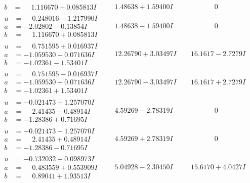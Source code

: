 \documentclass[1p]{elsarticle_modified}
\theoremstyle{definition}
\begin{document}
$$\begin{array}{c|c|c}
\begin{aligned}
b &= \phantom{-}1.116670 - 0.085813 I\end{aligned}
 & \phantom{-}1.48638 + 1.59400 I & \phantom{-0.000000 } 0 \\ \hline\begin{aligned}
u &= \phantom{-}0.248016 - 1.217990 I \\
a &= -2.02802 - 0.13854 I \\
b &= \phantom{-}1.116670 + 0.085813 I\end{aligned}
 & \phantom{-}1.48638 - 1.59400 I & \phantom{-0.000000 } 0 \\ \hline\begin{aligned}
u &= \phantom{-}0.751595 + 0.016937 I \\
a &= -1.059530 - 0.071636 I \\
b &= -1.02361 - 1.53401 I\end{aligned}
 & \phantom{-}12.26790 + 3.03497 I & \phantom{-}16.1617 - 2.7279 I \\ \hline\begin{aligned}
u &= \phantom{-}0.751595 - 0.016937 I \\
a &= -1.059530 + 0.071636 I \\
b &= -1.02361 + 1.53401 I\end{aligned}
 & \phantom{-}12.26790 - 3.03497 I & \phantom{-}16.1617 + 2.7279 I \\ \hline\begin{aligned}
u &= -0.021473 + 1.257070 I \\
a &= \phantom{-}2.41435 - 0.48914 I \\
b &= -1.28386 + 0.71695 I\end{aligned}
 & \phantom{-}4.59269 - 2.78319 I & \phantom{-0.000000 } 0 \\ \hline\begin{aligned}
u &= -0.021473 - 1.257070 I \\
a &= \phantom{-}2.41435 + 0.48914 I \\
b &= -1.28386 - 0.71695 I\end{aligned}
 & \phantom{-}4.59269 + 2.78319 I & \phantom{-0.000000 } 0 \\ \hline\begin{aligned}
u &= -0.732032 + 0.098973 I \\
a &= \phantom{-}0.483559 + 0.553909 I \\
b &= \phantom{-}0.89041 + 1.93513 I\end{aligned}
 & \phantom{-}5.04928 - 2.30450 I & \phantom{-}15.6170 + 4.0427 I \\ \hline\begin{aligned}

\end{aligned}
\end{array}$$
\end{document}
